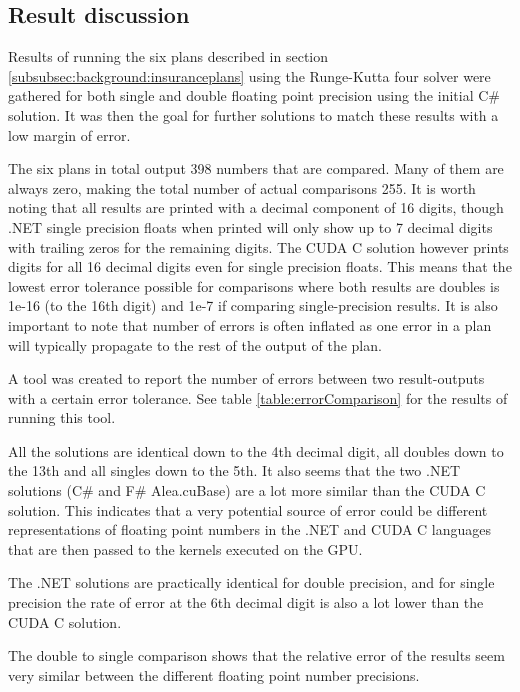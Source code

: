 \subsection{Result discussion}\label{subsec:result_comparison}
Results of running the six plans described in section \ref{subsubsec:background:insuranceplans} using the Runge-Kutta four solver were gathered for both single and double floating point precision using the initial C\# solution.
It was then the goal for further solutions to match these results with a low margin of error.

The six plans in total output 398 numbers that are compared. 
Many of them are always zero, making the total number of actual comparisons 255.
It is worth noting that all results are printed with a decimal component of 16 digits, though .NET single precision floats when printed will only show up to 7 decimal digits with trailing zeros for the remaining digits.
The CUDA C solution however prints digits for all 16 decimal digits even for single precision floats.
This means that the lowest error tolerance possible for comparisons where both results are doubles is 1e-16 (to the 16th digit) and 1e-7 if comparing single-precision results.
It is also important to note that number of errors is often inflated as one error in a plan will typically propagate to the rest of the output of the plan.

A tool was created to report the number of errors between two result-outputs with a certain error tolerance.
See table \ref{table:errorComparison} for the results of running this tool.

All the solutions are identical down to the 4th decimal digit, all doubles down to the 13th and all singles down to the 5th.
It also seems that the two .NET solutions (C\# and F\# Alea.cuBase) are a lot more similar than the CUDA C solution.
This indicates that a very potential source of error could be different representations of floating point numbers in the .NET and CUDA C languages that are then passed to the kernels executed on the GPU.

The .NET solutions are practically identical for double precision, and for single precision the rate of error at the 6th decimal digit is also a lot lower than the CUDA C solution.

The double to single comparison shows that the relative error of the results seem very similar between the different floating point number precisions.


